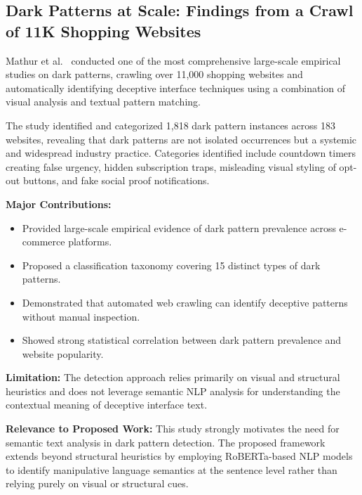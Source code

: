 
\subsection{Dark Patterns at Scale: Findings from a Crawl of 11K Shopping Websites}

Mathur et al.~\cite{mathur2019} conducted one of the most comprehensive large-scale empirical studies on dark patterns, crawling over 11,000 shopping websites and automatically identifying deceptive interface techniques using a combination of visual analysis and textual pattern matching.

The study identified and categorized 1,818 dark pattern instances across 183 websites, revealing that dark patterns are not isolated occurrences but a systemic and widespread industry practice. Categories identified include countdown timers creating false urgency, hidden subscription traps, misleading visual styling of opt-out buttons, and fake social proof notifications.

\vspace{0.3cm}

\textbf{Major Contributions:}
\begin{itemize}
\item Provided large-scale empirical evidence of dark pattern prevalence across e-commerce platforms.
\item Proposed a classification taxonomy covering 15 distinct types of dark patterns.
\item Demonstrated that automated web crawling can identify deceptive patterns without manual inspection.
\item Showed strong statistical correlation between dark pattern prevalence and website popularity.
\end{itemize}

\vspace{0.3cm}

\textbf{Limitation:}
The detection approach relies primarily on visual and structural heuristics and does not leverage semantic NLP analysis for understanding the contextual meaning of deceptive interface text.

\vspace{0.3cm}

\textbf{Relevance to Proposed Work:}
This study strongly motivates the need for semantic text analysis in dark pattern detection. The proposed framework extends beyond structural heuristics by employing RoBERTa-based NLP models to identify manipulative language semantics at the sentence level rather than relying purely on visual or structural cues.

